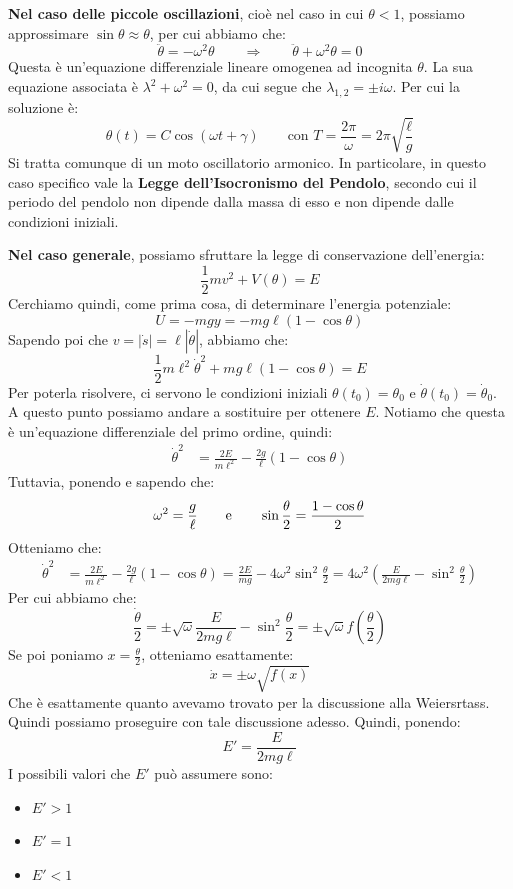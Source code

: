 \documentclass[11pt,a4paper,twoside]{article}
\theoremstyle{definition}
\begin{document}
\textbf{Nel caso delle piccole oscillazioni}, cioè nel caso in cui $\theta<1$, possiamo approssimare $\sin \theta \approx \theta$, per cui abbiamo che:
\[ \ddot \theta = -\omega^2 \theta \qquad \Rightarrow \qquad \ddot \theta + \omega^2 \theta = 0 \]
Questa è un'equazione differenziale lineare omogenea ad incognita $\theta$.
La sua equazione associata è $\lambda^2 + \omega^2 = 0$, da cui segue che $\lambda_{1,2} = \pm i \omega$. Per cui la soluzione è:
\[ \theta (t) = C\cos (\omega t + \gamma) \qquad \text{con }T = \frac{2\pi}\omega = 2 \pi \sqrt{\frac \ell g} \]
Si tratta comunque di un moto oscillatorio armonico. In particolare, in questo caso specifico vale la \textbf{Legge dell'Isocronismo del Pendolo}, secondo cui il periodo del pendolo non dipende dalla massa di esso e non dipende dalle condizioni iniziali.

\textbf{Nel caso generale}, possiamo sfruttare la legge di conservazione dell'energia:
\[ \frac 12 mv^2 + V(\theta) = E \]
Cerchiamo quindi, come prima cosa, di determinare l'energia potenziale:
\[ U = -mgy = -mg\ell (1-\cos \theta) \]
Sapendo poi che $v = |\dot s| = \ell |\dot \theta|$, abbiamo che:
\[ \frac 12 m\ell^2 \dot \theta^2 + mg\ell (1-\cos \theta) = E \]
Per poterla risolvere, ci servono le condizioni iniziali $\theta(t_0) = \theta_0$ e $\dot\theta(t_0) = \dot \theta_0$. A questo punto possiamo andare a sostituire per ottenere $E$. Notiamo che questa è un'equazione differenziale del primo ordine, quindi:
\begin{align*}
	\dot \theta^2 &= \frac{2E}{m\ell^2} - \frac{2g}{\ell}(1-\cos \theta)
\end{align*}
Tuttavia, ponendo e sapendo che:
\[ \omega^2 = \frac g \ell\qquad \text e \qquad \sin \frac \theta 2 = \frac{1-\cos \theta}2 \]
Otteniamo che:
\begin{align*}
	\dot \theta^2 &= \frac{2E}{m\ell^2} - \frac{2g}{\ell}(1-\cos \theta) = \frac{2E}{mg} - 4 \omega^2 \sin^2 \frac \theta 2 = 4\omega^2 \left( \frac{E}{2mg\ell} - \sin^2\frac \theta 2 \right)
\end{align*}
Per cui abbiamo che:
\[ \frac{\dot \theta}2 = \pm \sqrt \omega{\frac{E}{2mg\ell} - \sin^2\frac \theta 2} = \pm \sqrt \omega{f\left(\frac \theta 2\right)}\]
Se poi poniamo $x = \frac \theta 2$, otteniamo esattamente:
\[ \dot x = \pm \omega \sqrt{f(x)} \]
Che è esattamente quanto avevamo trovato per la discussione alla Weiersrtass. Quindi possiamo proseguire con tale discussione adesso. Quindi, ponendo:
\[ E' = \frac E{2mg \ell} \]
I possibili valori che $E'$ può assumere sono:
\begin{itemize}
	\item $E'>1$
	\item $E' = 1$
	\item $E'<1$
\end{itemize}
\end{document}
